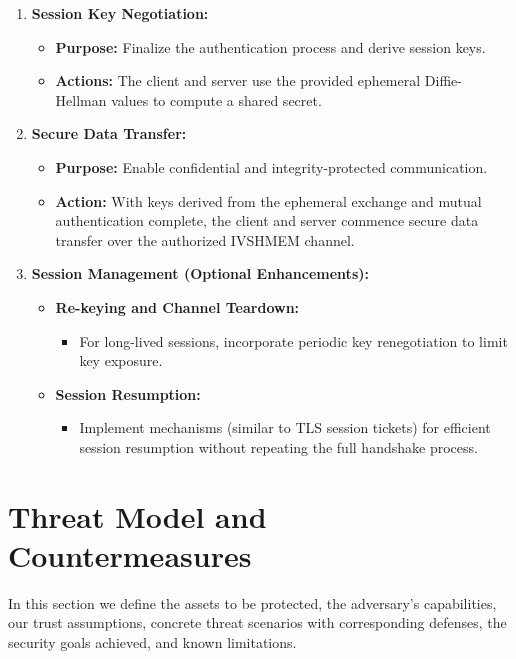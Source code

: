 \documentclass[conference]{IEEEtran}
\begin{document}
\begin{enumerate}[label=\arabic*.]
  \item \textbf{Session Key Negotiation:}
    \begin{itemize}
      \item \textbf{Purpose:} Finalize the authentication process and derive session keys.
      \item \textbf{Actions:} The client and server use the provided ephemeral Diffie-Hellman values to compute a shared secret.
    \end{itemize}
    
  \item \textbf{Secure Data Transfer:}
    \begin{itemize}
      \item \textbf{Purpose:} Enable confidential and integrity-protected communication.
      \item \textbf{Action:} With keys derived from the ephemeral exchange and mutual authentication complete, the client and server commence secure data transfer over the authorized IVSHMEM channel.
    \end{itemize}
    
  \item \textbf{Session Management (Optional Enhancements):}
    \begin{itemize}
      \item \textbf{Re-keying and Channel Teardown:}
        \begin{itemize}
          \item For long-lived sessions, incorporate periodic key renegotiation to limit key exposure.
        \end{itemize}
      \item \textbf{Session Resumption:}
        \begin{itemize}
          \item Implement mechanisms (similar to TLS session tickets) for efficient session resumption without repeating the full handshake process.
        \end{itemize}
    \end{itemize}
\end{enumerate}




\section{Threat Model and Countermeasures}

In this section we define the assets to be protected, the adversary’s capabilities, our trust assumptions, concrete threat scenarios with corresponding defenses, the security goals achieved, and known limitations.
\end{document}
